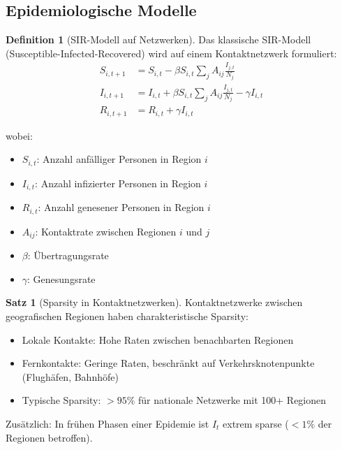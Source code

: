 ﻿\documentclass[a4paper,12pt]{report}
\theoremstyle{definition}
\newtheorem{definition}{Definition}
\newtheorem{satz}{Satz}
\begin{document}
	\subsection{Epidemiologische Modelle}
	
	\begin{definition}[SIR-Modell auf Netzwerken]
		Das klassische SIR-Modell (Susceptible-Infected-Recovered) wird auf einem Kontaktnetzwerk formuliert:
		\begin{align}
			S_{i,t+1} &= S_{i,t} - \beta S_{i,t} \sum_{j} A_{ij} \frac{I_{j,t}}{N_j} \\
			I_{i,t+1} &= I_{i,t} + \beta S_{i,t} \sum_{j} A_{ij} \frac{I_{j,t}}{N_j} - \gamma I_{i,t} \\
			R_{i,t+1} &= R_{i,t} + \gamma I_{i,t}
		\end{align}
		
		wobei:
		\begin{itemize}
			\item $S_{i,t}$: Anzahl anfälliger Personen in Region $i$
			\item $I_{i,t}$: Anzahl infizierter Personen in Region $i$
			\item $R_{i,t}$: Anzahl genesener Personen in Region $i$
			\item $A_{ij}$: Kontaktrate zwischen Regionen $i$ und $j$
			\item $\beta$: Übertragungsrate
			\item $\gamma$: Genesungsrate
		\end{itemize}
	\end{definition}
	
	\begin{satz}[Sparsity in Kontaktnetzwerken]
		Kontaktnetzwerke zwischen geografischen Regionen haben charakteristische Sparsity:
		\begin{itemize}
			\item Lokale Kontakte: Hohe Raten zwischen benachbarten Regionen
			\item Fernkontakte: Geringe Raten, beschränkt auf Verkehrsknotenpunkte (Flughäfen, Bahnhöfe)
			\item Typische Sparsity: $> 95\%$ für nationale Netzwerke mit 100+ Regionen
		\end{itemize}
		
		Zusätzlich: In frühen Phasen einer Epidemie ist $I_t$ extrem sparse ($< 1\%$ der Regionen betroffen).
	\end{satz}
	
\end{document}
